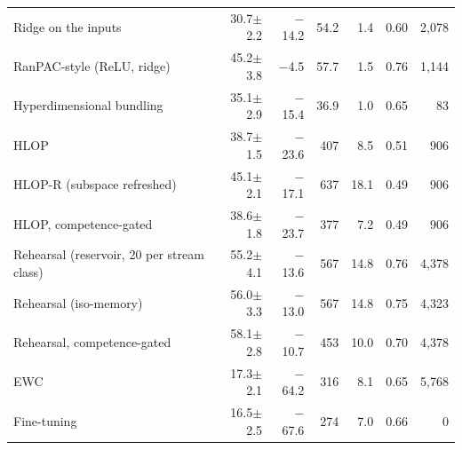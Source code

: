 \begin{tabular*}{\textwidth}{@{\extracolsep{\fill}}lrrrrrr@{}}
Ridge on the inputs & 30.7$\pm$2.2 & \ensuremath{-}14.2 & 54.2 & 1.4 & 0.60 & 2,078 \\
RanPAC-style (ReLU, ridge) & 45.2$\pm$3.8 & \ensuremath{-}4.5 & 57.7 & 1.5 & 0.76 & 1,144 \\
Hyperdimensional bundling & 35.1$\pm$2.9 & \ensuremath{-}15.4 & 36.9 & 1.0 & 0.65 & 83 \\
HLOP & 38.7$\pm$1.5 & \ensuremath{-}23.6 & 407 & 8.5 & 0.51 & 906 \\
HLOP-R (subspace refreshed) & 45.1$\pm$2.1 & \ensuremath{-}17.1 & 637 & 18.1 & 0.49 & 906 \\
HLOP, competence-gated & 38.6$\pm$1.8 & \ensuremath{-}23.7 & 377 & 7.2 & 0.49 & 906 \\
Rehearsal (reservoir, 20 per stream class) & 55.2$\pm$4.1 & \ensuremath{-}13.6 & 567 & 14.8 & 0.76 & 4,378 \\
Rehearsal (iso-memory) & 56.0$\pm$3.3 & \ensuremath{-}13.0 & 567 & 14.8 & 0.75 & 4,323 \\
Rehearsal, competence-gated & 58.1$\pm$2.8 & \ensuremath{-}10.7 & 453 & 10.0 & 0.70 & 4,378 \\
EWC & 17.3$\pm$2.1 & \ensuremath{-}64.2 & 316 & 8.1 & 0.65 & 5,768 \\
Fine-tuning & 16.5$\pm$2.5 & \ensuremath{-}67.6 & 274 & 7.0 & 0.66 & 0 \\
\bottomrule
\end{tabular*}
